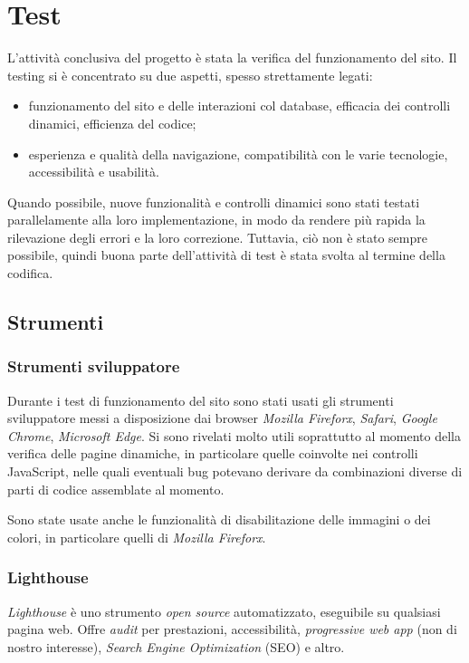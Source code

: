 \section{Test}
\label{test}
L'attività conclusiva del progetto è stata la verifica del funzionamento del sito. Il testing si è concentrato su due aspetti, spesso strettamente legati: 
\begin{itemize}
	\item funzionamento del sito e delle interazioni col database, efficacia dei controlli dinamici, efficienza del codice;
	\item esperienza e qualità della navigazione, compatibilità con le varie tecnologie, accessibilità e usabilità.
\end{itemize}
Quando possibile, nuove funzionalità e controlli dinamici sono stati testati parallelamente alla loro implementazione, in modo da rendere più rapida la rilevazione degli errori e la loro correzione. Tuttavia, ciò non è stato sempre possibile, quindi buona parte dell'attività di test è stata svolta al termine della codifica.

\subsection{Strumenti}
\label{test-strumenti}

\subsubsection{Strumenti sviluppatore}
\label{test-strumenti-sviluppatore}
Durante i test di funzionamento del sito sono stati usati gli strumenti sviluppatore messi a disposizione dai browser \textit{Mozilla Fireforx}, \textit{Safari}, \textit{Google Chrome}, \textit{Microsoft Edge}. Si sono rivelati molto utili soprattutto al momento della verifica delle pagine dinamiche, in particolare quelle coinvolte nei controlli JavaScript, nelle quali eventuali bug potevano derivare da combinazioni diverse di parti di codice assemblate al momento.

Sono state usate anche le funzionalità di disabilitazione delle immagini o dei colori, in particolare quelli di \textit{Mozilla Fireforx}.


\subsubsection{Lighthouse}
\label{test-strumenti-lighthouse}
\textit{Lighthouse} è uno strumento \textit{open source} automatizzato, eseguibile su qualsiasi pagina web. Offre \textit{audit} per prestazioni, accessibilità, \textit{progressive web app} (non di nostro interesse), \textit{Search Engine Optimization} (SEO) e altro.

